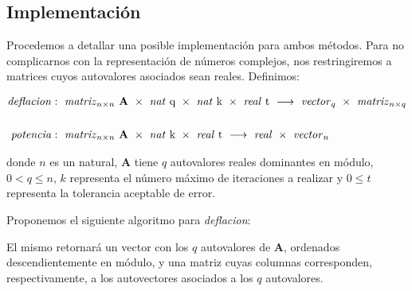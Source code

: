 \vspace{1em}





\vspace{2em}
\subsection{Implementación} Procedemos a detallar una posible implementación para ambos métodos. Para no complicarnos con la representación de números complejos, nos restringiremos a matrices cuyos autovalores asociados sean reales. Definimos:

\begin{align*}
    \text{\textit{deflacion}}&:\ \text{\textit{matriz}}_{n \times n}\ \mathbf{A}\ \times\ \text{\textit{nat} q}\ \times\ \text{\textit{nat} k}\ \times\ \text{\textit{real} t}\
    \longrightarrow\ \text{\textit{vector}}_q\ \times\ \text{\textit{matriz}}_{n \times q}
    \\ \\
    \text{\textit{potencia}}&:\ \text{\textit{matriz}}_{n \times n}\ \mathbf{A}\ \times\ \text{\textit{nat} k}\ \times\ \text{\textit{real} t}\ 
    \longrightarrow\ \text{\textit{real}}\ \times\ \text{\textit{vector}}_n
\end{align*}

\vspace{1em}
\noindent donde $n$ es un natural, \textbf{A} tiene $q$ autovalores reales dominantes en módulo, $0 < q \leq n$, $k$ representa el número máximo de iteraciones a realizar y $0 \leq t$ representa la tolerancia aceptable de error. 


\vspace{2em}
\noindent Proponemos el siguiente algoritmo para \textit{deflacion}: 

\vspace{1em}


\vspace{1em}
El mismo retornará un vector con los $q$ autovalores de \textbf{A}, ordenados descendientemente en módulo, y una matriz cuyas columnas corresponden, respectivamente, a los autovectores asociados a los $q$ autovalores. 

\vspace{1em}


